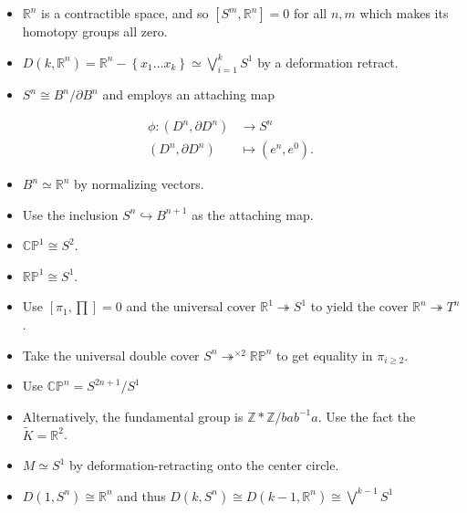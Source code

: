 \begin{fact}

\envlist

\begin{itemize}
\item
  \({\mathbb{R}}^n\) is a contractible space, and so
  \([S^m, {\mathbb{R}}^n] = 0\) for all \(n, m\) which makes its
  homotopy groups all zero.
\item
  \(D(k, {\mathbb{R}}^n) = {\mathbb{R}}^n - \left\{{x_{1} \ldots x_{k}}\right\} \simeq\bigvee_{i=1}^k S^1\)
  by a deformation retract.
\item
  \(S^n \cong B^n / {\partial}B^n\) and employs an attaching map
\end{itemize}

\begin{align*}
\phi: (D^n, {\partial}D^n) &\to S^n \\ 
(D^n, {\partial}D^n) &\mapsto (e^n, e^0)
.\end{align*}

\begin{itemize}
\item
  \(B^n \simeq{\mathbb{R}}^n\) by normalizing vectors.
\item
  Use the inclusion \(S^n \hookrightarrow B^{n+1}\) as the attaching
  map.
\item
  \({\mathbb{CP}}^1 \cong S^2\).
\item
  \({\mathbb{RP}}^1 \cong S^1\).
\item
  Use \(\left[ \pi_{1}, \prod \right]= 0\) and the universal cover
  \({\mathbb{R}}^1 \twoheadrightarrow S^1\) to yield the cover
  \({\mathbb{R}}^n \twoheadrightarrow T^n\).
\item
  Take the universal double cover
  \(S^n \twoheadrightarrow^{\times 2} {\mathbb{RP}}^n\) to get equality
  in \(\pi_{i\geq 2}\).
\item
  Use \({\mathbb{CP}}^n = S^{2n+1} / S^1\)
\item
  Alternatively, the fundamental group is
  \({\mathbb{Z}}\ast{\mathbb{Z}}/ bab^{-1}a\). Use the fact the
  \(\tilde K = {\mathbb{R}}^2\).
\item
  \(M \simeq S^1\) by deformation-retracting onto the center circle.
\item
  \(D(1, S^n) \cong {\mathbb{R}}^n\) and thus
  \(D(k, S^n) \cong D(k-1, {\mathbb{R}}^n) \cong \bigvee^{k-1} S^1\)
\end{itemize}

\end{fact}

